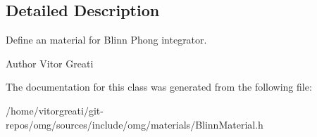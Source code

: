 \subsection{Detailed Description}
Define an material for Blinn Phong integrator. 

\begin{DoxyAuthor}{Author}
Vitor Greati 
\end{DoxyAuthor}


The documentation for this class was generated from the following file\+:\begin{DoxyCompactItemize}
\item 
/home/vitorgreati/git-\/repos/omg/sources/include/omg/materials/Blinn\+Material.\+h\end{DoxyCompactItemize}
